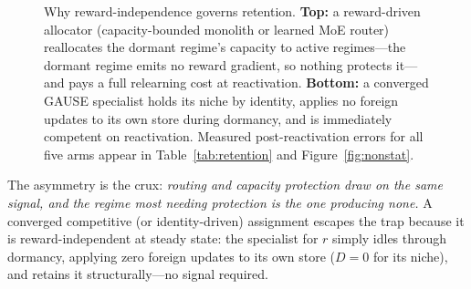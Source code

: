 \documentclass[10pt]{article}
\begin{document}
\begin{figure}[t]
\caption{Why reward-independence governs retention. \textbf{Top:} a
reward-driven allocator (capacity-bounded monolith or learned MoE router)
reallocates the dormant regime's capacity to active regimes---the dormant
regime emits no reward gradient, so nothing protects it---and pays a full
relearning cost at reactivation. \textbf{Bottom:} a converged GAUSE
specialist holds its niche by identity, applies no foreign updates to its own
store during dormancy, and is immediately competent on reactivation. Measured
post-reactivation errors for all five arms appear in
Table~\ref{tab:retention} and Figure~\ref{fig:nonstat}.}
\label{fig:timeline}
\end{figure}

The asymmetry is the crux: \emph{routing and capacity protection draw on the
same signal, and the regime most needing protection is the one producing none.}
A converged competitive (or identity-driven) assignment escapes the trap because
it is reward-independent at steady state: the specialist for $r$ simply idles
through dormancy, applying zero foreign updates to its own store ($D = 0$ for
its niche), and retains it structurally---no signal required.
\end{document}
